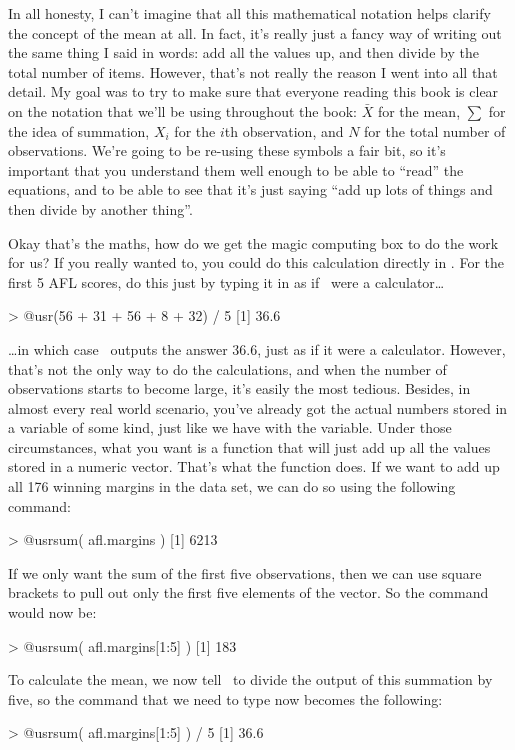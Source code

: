 In all honesty, I can't imagine that all this mathematical notation helps clarify the concept of the mean at all. In fact, it's really just a fancy way of writing out the same thing I said in words: add all the values up, and then divide by the total number of items. However, that's not really the reason I went into all that detail. My goal was to try to make sure that everyone reading this book is clear on the notation that we'll be using throughout the book: $\bar{X}$ for the mean, $\scriptstyle\sum$ for the idea of summation, $X_i$ for the $i$th observation, and $N$ for the total number of observations. We're going to be re-using these symbols a fair bit, so it's important that you understand them well enough to be able to ``read'' the equations, and to be able to see that it's just saying ``add up lots of things and then divide by another thing''.


Okay that's the maths, how do we get the magic computing box to do the work for us? If you really wanted to, you could do this calculation directly in \R. For the first 5 AFL scores, do this just by typing it in as if \R\ were a calculator\ldots
\begin{rblock1}
> @usr{(56 + 31 + 56 + 8 + 32) / 5}
[1] 36.6
\end{rblock1}
\ldots in which case \R\ outputs the answer 36.6, just as if it were a calculator. However, that's not the only way to do the calculations, and when the number of observations starts to become large, it's easily the most tedious. Besides, in almost every real world scenario, you've already got the actual numbers stored in a variable of some kind, just like we have with the  variable. Under those circumstances, what you want is a function that will just add up all the values stored in a numeric vector. That's what the  function does. If we want to add up all 176 winning margins in the data set, we can do so using the following command:
\begin{rblock1}
> @usr{sum( afl.margins )}
[1] 6213
\end{rblock1}
If we only want the sum of the first five observations, then we can use square brackets to pull out only the first five elements of the vector. So the command would now be: 
\begin{rblock1}
> @usr{sum( afl.margins[1:5] )}
[1] 183
\end{rblock1}
To calculate the mean, we now tell \R\ to divide the output of this summation by five, so the command that we need to type now becomes the following:
\begin{rblock1}
> @usr{sum( afl.margins[1:5] ) / 5}
[1] 36.6
\end{rblock1}

